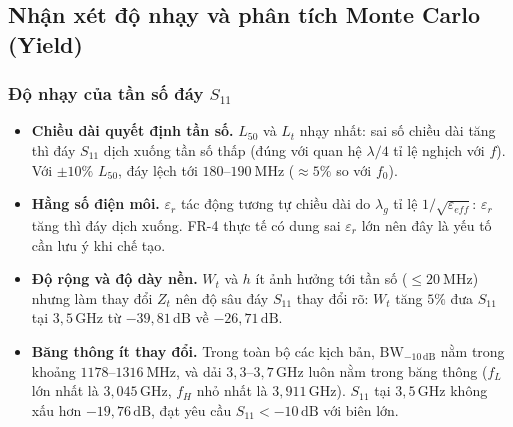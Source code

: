 \documentclass[a4paper]{report}
\newcommand\dB{\,\mathrm{dB}}
\newcommand\GHz{\,\mathrm{GHz}}
\begin{document}
\subsection{Nhận xét độ nhạy và phân tích Monte Carlo (Yield)}

\subsubsection{Độ nhạy của tần số đáy $S_{11}$}
\begin{table}[H]
\caption{Độ nhạy của tần số đáy $S_{11}$ theo sai số tham số}
\centering\footnotesize\setlength\tabcolsep{3pt}
\end{table}

\begin{itemize}
  \item \textbf{Chiều dài quyết định tần số.} $L_{50}$ và $L_t$ nhạy nhất: sai số chiều dài tăng thì đáy $S_{11}$ dịch xuống tần số thấp (đúng với quan hệ $\lambda/4$ tỉ lệ nghịch với $f$). Với $\pm10\%$ $L_{50}$, đáy lệch tới $180$--$190\ \mathrm{MHz}$ ($\approx5\%$ so với $f_0$).
  \item \textbf{Hằng số điện môi.} $\varepsilon_r$ tác động tương tự chiều dài do $\lambda_g$ tỉ lệ $1/\sqrt{\varepsilon_{eff}}$: $\varepsilon_r$ tăng thì đáy dịch xuống. FR-4 thực tế có dung sai $\varepsilon_r$ lớn nên đây là yếu tố cần lưu ý khi chế tạo.
  \item \textbf{Độ rộng và độ dày nền.} $W_t$ và $h$ ít ảnh hưởng tới tần số ($\le20\ \mathrm{MHz}$) nhưng làm thay đổi $Z_t$ nên độ sâu đáy $S_{11}$ thay đổi rõ: $W_t$ tăng $5\%$ đưa $S_{11}$ tại $3{,}5\GHz$ từ $-39{,}81\dB$ về $-26{,}71\dB$.
  \item \textbf{Băng thông ít thay đổi.} Trong toàn bộ các kịch bản, $\mathrm{BW}_{-10\dB}$ nằm trong khoảng $1178$--$1316\ \mathrm{MHz}$, và dải $3{,}3$--$3{,}7\GHz$ luôn nằm trong băng thông ($f_L$ lớn nhất là $3{,}045\GHz$, $f_H$ nhỏ nhất là $3{,}911\GHz$). $S_{11}$ tại $3{,}5\GHz$ không xấu hơn $-19{,}76\dB$, đạt yêu cầu $S_{11}<-10\dB$ với biên lớn.
\end{itemize}
\end{document}
